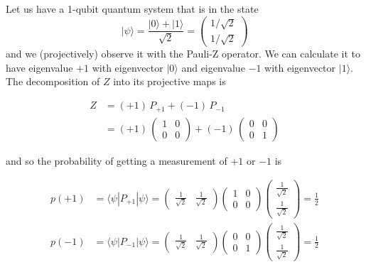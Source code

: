 \documentclass{article}
\begin{document}
  \begin{example}
    Let us have a 1-qubit quantum system that is in the state
    \[|\psi \rangle = \frac{|0\rangle + |1 \rangle}{\sqrt{2}} = \begin{pmatrix} 1/\sqrt{2} \\ 1/\sqrt{2} \end{pmatrix}\]
    and we (projectively) observe it with the Pauli-Z operator. We can calculate it to have eigenvalue $+1$ with eigenvector $|0\rangle$ and eigenvalue $-1$ with eigenvector $|1\rangle$. The decomposition of $Z$ into its projective maps is

    \begin{align*}
      Z & = (+1) \, P_{+1} + (-1)\, P_{-1} \\
      & = (+1) \, \begin{pmatrix} 1&0\\0&0 \end{pmatrix} + (-1)\, \begin{pmatrix} 0&0\\0&1 \end{pmatrix}
    \end{align*}

    and so the probability of getting a measurement of $+1$ or $-1$ is

    \begin{align*}
      p(+1) & = \langle \psi | P_{+1} | \psi \rangle = \begin{pmatrix} \frac{1}{\sqrt{2}} & \frac{1}{\sqrt{2}} \end{pmatrix} \begin{pmatrix} 1&0\\0&0 \end{pmatrix} \begin{pmatrix} \frac{1}{\sqrt{2}} \\ \frac{1}{\sqrt{2}} \end{pmatrix} = \frac{1}{2} \\
      p(-1) & = \langle \psi | P_{-1} | \psi \rangle = \begin{pmatrix} \frac{1}{\sqrt{2}} & \frac{1}{\sqrt{2}} \end{pmatrix} \begin{pmatrix} 0&0\\0&1 \end{pmatrix} \begin{pmatrix} \frac{1}{\sqrt{2}} \\ \frac{1}{\sqrt{2}} \end{pmatrix} = \frac{1}{2}
    \end{align*}
  \end{example}
\end{document}
